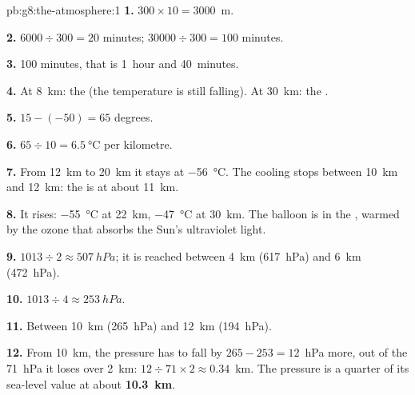 \begin{solution}{pb:g8:the-atmosphere:1}
\textbf{1.} $300 \times 10 = 3000$~m.

\textbf{2.} $6000 \div 300 = 20$ minutes; $\num{30000} \div 300 = 100$
minutes.

\textbf{3.} 100 minutes, that is 1~hour and 40~minutes.

\textbf{4.} At \qty{8}{km}: the  (the temperature is still
falling). At \qty{30}{km}: the .

\textbf{5.} $15 - (-50) = 65$ degrees.

\textbf{6.} $65 \div 10 = \qty{6.5}{\degreeCelsius}$ per kilometre.

\textbf{7.} From \qty{12}{km} to \qty{20}{km} it stays at
\qty{-56}{\degreeCelsius}. The cooling stops between \qty{10}{km} and
\qty{12}{km}: the  is at about \qty{11}{km}.

\textbf{8.} It rises: \qty{-55}{\degreeCelsius} at \qty{22}{km},
\qty{-47}{\degreeCelsius} at \qty{30}{km}. The balloon is in the
, warmed by the ozone that absorbs the Sun's ultraviolet
light.

\textbf{9.} $1013 \div 2 \approx \qty{507}{hPa}$; it is reached between
\qty{4}{km} (\qty{617}{hPa}) and \qty{6}{km} (\qty{472}{hPa}).

\textbf{10.} $1013 \div 4 \approx \qty{253}{hPa}$.

\textbf{11.} Between \qty{10}{km} (\qty{265}{hPa}) and \qty{12}{km}
(\qty{194}{hPa}).

\textbf{12.} From \qty{10}{km}, the pressure has to fall by $265 - 253 =
12$~hPa more, out of the 71~hPa it loses over 2~km: $12 \div 71 \times 2
\approx 0.34$~km. The pressure is a quarter of its sea-level value at
about \textbf{\qty{10.3}{km}}.
\end{solution}
